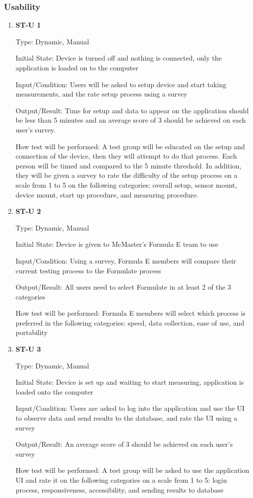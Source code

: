 \documentclass[12pt, titlepage]{article}
\begin{document}
\subsubsection{Usability}

\begin{enumerate}

\item{\bf{ST-U 1}}

Type: Dynamic, Manual
          
Initial State: Device is turned off and nothing is connected, only the application is loaded on to the computer
          
Input/Condition: Users will be asked to setup device and start taking measurements, and the rate setup process using a survey
          
Output/Result: Time for setup and data to appear on the application should be less than 5 minutes and an average score of 3 should be achieved on each user's survey.
          
How test will be performed: A test group will be educated on the setup and connection of the device, then they will attempt to do that process. 
Each person will be timed and compared to the 5 minute threshold. In addition, they will be given a survey to rate the difficulty of the setup process on a scale from 
1 to 5 on the following categories: overall setup, sensor mount, device mount, start up procedure, and measuring procedure.  

\item{\bf{ST-U 2}}

Type: Dynamic, Manual
					
Initial State: Device is given to McMaster's Formula E team to use
					
Input/Condition: Using a survey, Formula E members will compare their current testing process to the Formulate process
					
Output/Result: All users need to select Formulate in at least 2 of the 3 categories
					
How test will be performed: Formula E members will select which process is preferred in the following categories: speed, data collection, ease of use, and portability

\item{\bf{ST-U 3}}

Type: Dynamic, Manual
					
Initial State: Device is set up and waiting to start measuring, application is loaded onto the computer
					
Input/Condition: Users are asked to log into the application and use the UI to observe data and send results to the database, and rate the UI using a survey
					
Output/Result: An average score of 3 should be achieved on each user's survey
					
How test will be performed: A test group will be asked to use the application UI and rate it on the following categories on a scale from 1 to 5: login process, responsiveness, accessibility, and sending results to database 

\end{enumerate}
\end{document}

